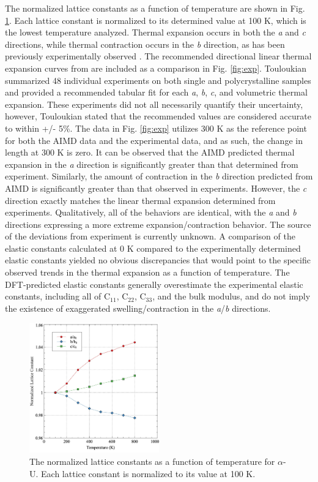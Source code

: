 \documentclass[utf8]{frontiersSCNS} %
\begin{document}
The normalized lattice constants as a function of temperature are shown in Fig. \ref{fig:a0}. Each lattice constant is normalized to its determined value at 100 K, which is the lowest temperature analyzed. Thermal expansion occurs in both the \textit{a} and \textit{c} directions, while thermal contraction occurs in the \textit{b} direction, as has been previously experimentally observed \cite{touloukian}. The recommended directional linear thermal expansion curves from \cite{touloukian} are included as a comparison in Fig. \ref{fig:exp}. Touloukian summarized 48 individual experiments on both single and polycrystalline samples and provided a recommended tabular fit for each \textit{a}, \textit{b}, \textit{c}, and volumetric thermal expansion. These experiments did not all necessarily quantify their uncertainty, however, Touloukian stated that the recommended values are considered accurate to within +/- 5\%. The data in Fig. \ref{fig:exp} utilizes 300 K as the reference point for both the AIMD data and the experimental data, and as such, the change in length at 300 K is zero. It can be observed that the AIMD predicted thermal expansion in the \textit{a} direction is significantly greater than that determined from experiment. Similarly, the amount of contraction in the \textit{b} direction predicted from AIMD is significantly greater than that observed in experiments. However, the \textit{c} direction exactly matches the linear thermal expansion determined from experiments. Qualitatively, all of the behaviors are identical, with the \textit{a} and \textit{b} directions expressing a more extreme expansion/contraction behavior. The source of the deviations from experiment is currently unknown. A comparison of the elastic constants calculated at 0 K \cite{beeler2013}compared to the experimentally determined elastic constants \cite{fisher1958} yielded no obvious discrepancies that would point to the specific observed trends in the thermal expansion as a function of temperature. The DFT-predicted elastic constants generally overestimate the experimental elastic constants, including all of C$_{11}$, C$_{22}$, C$_{33}$, and the bulk modulus, and do not imply the existence of exaggerated swelling/contraction in the \textit{a}/\textit{b} directions.

 \begin{figure}[hbt]
	\centering
	\includegraphics[width=0.5\textwidth]{a0_norm.jpg}
  \caption{The normalized lattice constants as a function of temperature for $\alpha$-U. Each lattice constant is normalized to its value at 100 K.}\label{fig:a0}
\end{figure}
\end{document}
